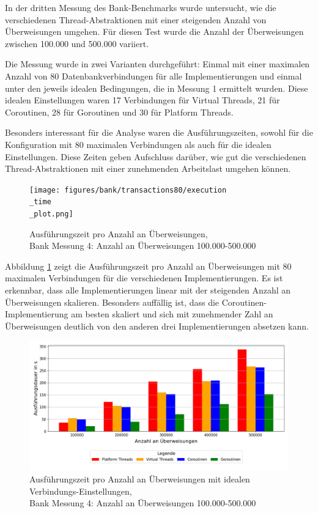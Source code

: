 \documentclass[fontsize=12pt,paper=a4,twoside=semi,parskip=half-,headsepline,headinclude]{scrreprt}
\begin{document}
In der dritten Messung des Bank-Benchmarks wurde untersucht, wie die verschiedenen Thread-Abstraktionen mit einer steigenden Anzahl von Überweisungen umgehen. Für diesen Test wurde die Anzahl der Überweisungen zwischen 100.000 und 500.000 variiert.

Die Messung wurde in zwei Varianten durchgeführt: Einmal mit einer maximalen Anzahl von 80 Datenbankverbindungen für alle Implementierungen und einmal unter den jeweils idealen Bedingungen, die in Messung 1 ermittelt wurden. Diese idealen Einstellungen waren 17 Verbindungen für Virtual Threads, 21 für Coroutinen, 28 für Goroutinen und 30 für Platform Threads.

Besonders interessant für die Analyse waren die Ausführungszeiten, sowohl für die Konfiguration mit 80 maximalen Verbindungen als auch für die idealen Einstellungen. Diese Zeiten geben Aufschluss darüber, wie gut die verschiedenen Thread-Abstraktionen mit einer zunehmenden Arbeitslast umgehen können.

\begin{figure}[H]
	\centering
	\texttt{[image: figures/bank/transactions80/execution\\\_time\\\_plot.png]}
	\caption{Ausführungszeit pro Anzahl an Überweisungen,\\ Bank Messung 4: Anzahl an Überweisungen 100.000-500.000}
	\label{fig:bankTransactions80Zeit}
\end{figure}

Abbildung \ref{fig:bankTransactions80Zeit} zeigt die Ausführungszeit pro Anzahl an Über\-wei\-sung\-en mit 80 maximalen Verbindungen für die verschiedenen Implementierungen. Es ist erkennbar, dass alle Implementierungen linear mit der steigenden Anzahl an Überweisungen skalieren. Besonders auffällig ist, dass die Coroutinen-Implementierung am besten skaliert und sich mit zunehmender Zahl an Überweisungen deutlich von den anderen drei Implementierungen absetzen kann.

\begin{figure}[H]
	\centering
	\includegraphics[scale=0.5]{figures/bank/transactionsIdeal/execution_time_plot.png}
	\caption{Ausführungszeit pro Anzahl an Überweisungen mit idealen Verbindungs-Einstellungen,\\ Bank Messung 4: Anzahl an Überweisungen 100.000-500.000}
	\label{fig:bankTransactionsIdealZeit}
\end{figure}
\end{document}
